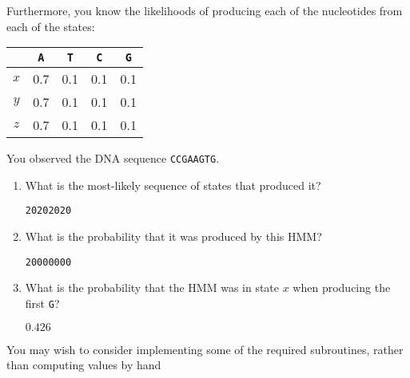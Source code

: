 \documentclass[10pt,\jkfside,a4paper]{article}
\begin{document}
\begin{enumerate}
\begin{figure}[H]

    \end{figure}

    Furthermore, you know the likelihoods of producing each of the nucleotides from each of the states:

    \begin{table}[H]
        
        \centering
        
        \begin{tabular}{ccccc}
            \hline
            & \texttt{A} & \texttt{T} & \texttt{C} & \texttt{G} \\
            \hline
            $x$ & 0.7 & 0.1 & 0.1 & 0.1 \\
            $y$ & 0.7 & 0.1 & 0.1 & 0.1 \\
            $z$ & 0.7 & 0.1 & 0.1 & 0.1 \\
            \hline
        \end{tabular}
        
    \end{table}

    You observed the DNA sequence \texttt{CCGAAGTG}.

        \begin{enumerate}

            \item What is the most-likely sequence of states that produced it?

            \texttt{20202020}

            \item What is the probability that it was produced by this HMM?

            \texttt{20000000}

            \item What is the probability that the HMM was in state $x$ when producing the first \texttt{G}?

            $0.426$

        \end{enumerate}

    You may wish to consider implementing some of the required subroutines, rather than computing values by hand

    
    

\end{enumerate}
\end{document}
